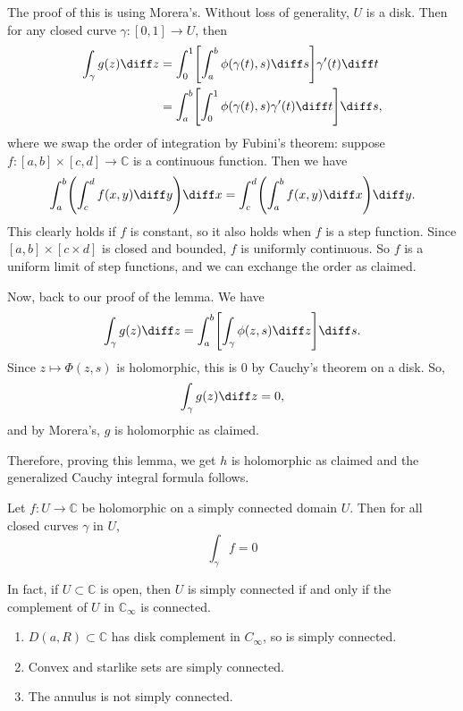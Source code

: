 \documentclass[12pt]{article}
\begin{document}
\begin{proofbox}
	The proof of this is using Morera's. Without loss of generality, $U$ is a disk. Then for any closed curve $\gamma : [0,1] \to U$, then
	\begin{align*}
		\int_{\gamma}g(z) \diff z &= \int_{0}^{1} \Biggl[ \int_{a}^{b} \phi(\gamma(t), s) \diff s \Biggr] \gamma'(t) \diff t \\
					  &= \int_{a}^{b} \Biggl[ \int_{0}^{1} \phi(\gamma(t), s)\gamma'(t) \diff t \Biggr] \diff s,
	\end{align*}
	where we swap the order of integration by Fubini's theorem: suppose $f : [a, b] \times [c, d] \to \mathbb{C}$ is a continuous function. Then we have
	\[
	\int_{a}^{b} \Biggl( \int_{c}^{d} f(x,y) \diff y \Biggr) \diff x = \int_{c}^{d}\Biggl( \int_{a}^{b} f(x,y) \diff x \Biggr) \diff y.
	\]
	This clearly holds if $f$ is constant, so it also holds when $f$ is a step function. Since $[a, b] \times [c \times d]$ is closed and bounded, $f$ is uniformly continuous. So $f$ is a uniform limit of step functions, and we can exchange the order as claimed.

	Now, back to our proof of the lemma. We have
	\[
		\int_{\gamma}g(z) \diff z = \int_{a}^{b} \Biggl[ \int_{\gamma} \phi(z, s) \diff z \Biggr] \diff s.
	\]
	Since $z \mapsto \Phi(z, s)$ is holomorphic, this is $0$ by Cauchy's theorem on a disk. So,
	\[
	\int_{\gamma} g(z) \diff z = 0,
	\]
	and by Morera's, $g$ is holomorphic as claimed.

	Therefore, proving this lemma, we get $h$ is holomorphic as claimed and the generalized Cauchy integral formula follows.
\end{proofbox}

\begin{corollary}
	Let $f : U \to \mathbb{C}$ be holomorphic on a simply connected domain $U$. Then for all closed curves $\gamma$ in $U$,
	\[
	\int_{\gamma}f = 0
	\]
\end{corollary}

In fact, if $U \subset \mathbb{C}$ is open, then $U$ is simply connected if and only if the complement of $U$ in $\mathbb{C}_{\infty}$ is connected.

\begin{exbox}
	\begin{enumerate}
		\item $D(a, R) \subset \mathbb{C}$ has disk complement in $C_{\infty}$, so is simply connected.
		\item Convex and starlike sets are simply connected.
		\item The annulus is not simply connected.
	\end{enumerate}	
\end{exbox}
\end{document}
